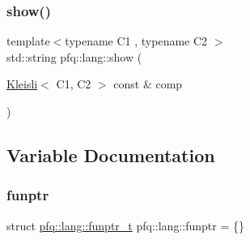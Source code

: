 \mbox{\label{namespacepfq_1_1lang_aecdf72ea1b9163a219332275af8c81f2}} 
\subsubsection{\texorpdfstring{show()}{show()}\hspace{0.1cm}{\footnotesize\ttfamily [8/8]}}
{\footnotesize\ttfamily template$<$typename C1 , typename C2 $>$ \\
std\+::string pfq\+::lang\+::show (\begin{DoxyParamCaption}\item[{\hyperlink{structpfq_1_1lang_1_1Kleisli}{Kleisli}$<$ C1, C2 $>$ const \&}]{comp }\end{DoxyParamCaption})\hspace{0.3cm}{\ttfamily [inline]}}



\subsection{Variable Documentation}
\mbox{\label{namespacepfq_1_1lang_a8d957b8f6df7198413d3ff9bd698e682}} 
\subsubsection{\texorpdfstring{funptr}{funptr}}
{\footnotesize\ttfamily struct \hyperlink{structpfq_1_1lang_1_1funptr__t}{pfq\+::lang\+::funptr\+\_\+t}  pfq\+::lang\+::funptr = \{\}}


